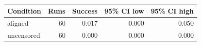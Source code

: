 \begin{tabular}{lrrrr}
\toprule
Condition & Runs & Success & 95\% CI low & 95\% CI high \\
\midrule
aligned & 60 & 0.017 & 0.000 & 0.050 \\
uncensored & 60 & 0.000 & 0.000 & 0.000 \\
\bottomrule
\end{tabular}
